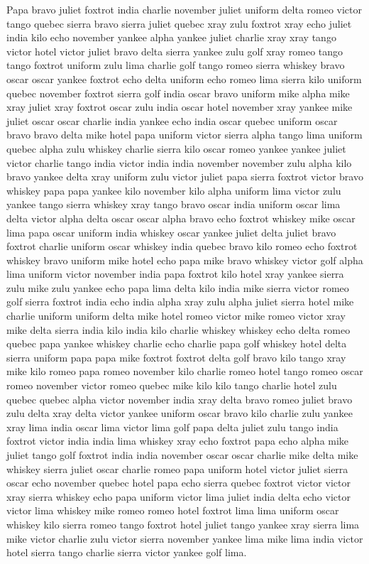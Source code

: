 \documentclass[12pt]{article}
\begin{document}
Papa bravo juliet foxtrot india charlie november juliet uniform delta
romeo victor tango quebec sierra bravo sierra juliet quebec xray zulu
foxtrot xray echo juliet india kilo echo november yankee alpha yankee
juliet charlie xray xray tango victor hotel victor juliet bravo delta
sierra yankee zulu golf xray romeo tango tango foxtrot uniform zulu lima
charlie golf tango romeo sierra whiskey bravo oscar oscar yankee foxtrot
echo delta uniform echo romeo lima sierra kilo uniform quebec november
foxtrot sierra golf india oscar bravo uniform mike alpha mike xray
juliet xray foxtrot oscar zulu india oscar hotel november xray yankee
mike juliet oscar oscar charlie india yankee echo india oscar quebec
uniform oscar bravo bravo delta mike hotel papa uniform victor sierra
alpha tango lima uniform quebec alpha zulu whiskey charlie sierra kilo
oscar romeo yankee yankee juliet victor charlie tango india victor india
india november november zulu alpha kilo bravo yankee delta xray uniform
zulu victor juliet papa sierra foxtrot victor bravo whiskey papa papa
yankee kilo november kilo alpha uniform lima victor zulu yankee tango
sierra whiskey xray tango bravo oscar india uniform oscar lima delta
victor alpha delta oscar oscar alpha bravo echo foxtrot whiskey mike
oscar lima papa oscar uniform india whiskey oscar yankee juliet delta
juliet bravo foxtrot charlie uniform oscar whiskey india quebec bravo
kilo romeo echo foxtrot whiskey bravo uniform mike hotel echo papa mike
bravo whiskey victor golf alpha lima uniform victor november india papa
foxtrot kilo hotel xray yankee sierra zulu mike zulu yankee echo papa
lima delta kilo india mike sierra victor romeo golf sierra foxtrot india
echo india alpha xray zulu alpha juliet sierra hotel mike charlie
uniform uniform delta mike hotel romeo victor mike romeo victor xray
mike delta sierra india kilo india kilo charlie whiskey whiskey echo
delta romeo quebec papa yankee whiskey charlie echo charlie papa golf
whiskey hotel delta sierra uniform papa papa mike foxtrot foxtrot delta
golf bravo kilo tango xray mike kilo romeo papa romeo november kilo
charlie romeo hotel tango romeo oscar romeo november victor romeo quebec
mike kilo kilo tango charlie hotel zulu quebec quebec alpha victor
november india xray delta bravo romeo juliet bravo zulu delta xray delta
victor yankee uniform oscar bravo kilo charlie zulu yankee xray lima
india oscar lima victor lima golf papa delta juliet zulu tango india
foxtrot victor india india lima whiskey xray echo foxtrot papa echo
alpha mike juliet tango golf foxtrot india india november oscar oscar
charlie mike delta mike whiskey sierra juliet oscar charlie romeo papa
uniform hotel victor juliet sierra oscar echo november quebec hotel papa
echo sierra quebec foxtrot victor victor xray sierra whiskey echo papa
uniform victor lima juliet india delta echo victor victor lima whiskey
mike romeo romeo hotel foxtrot lima lima uniform oscar whiskey kilo
sierra romeo tango foxtrot hotel juliet tango yankee xray sierra lima
mike victor charlie zulu victor sierra november yankee lima mike lima
india victor hotel sierra tango charlie sierra victor yankee golf lima.
\end{document}
